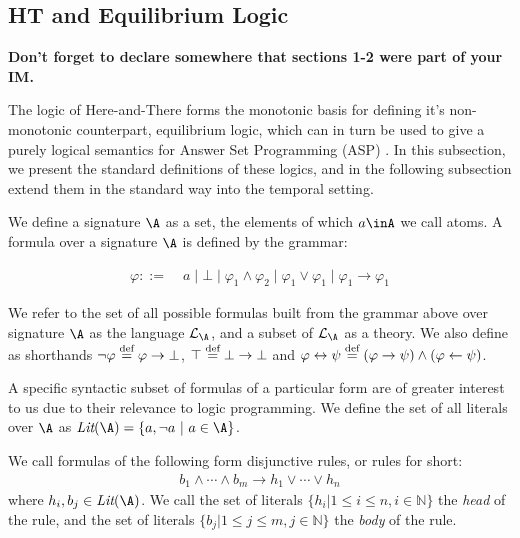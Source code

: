 \subsection{HT and Equilibrium Logic}

\textbf{Don't forget to declare somewhere that sections 1-2 were part
  of your IM.}

The logic of Here-and-There forms the monotonic basis for defining
it's non-monotonic counterpart, equilibrium logic, which can in turn
be used to give a purely logical semantics for Answer Set Programming
(ASP) \cite{pearce06a}. In this subsection, we present the standard
definitions of these logics, and in the following subsection extend
them in the standard way into the temporal setting.

We define a signature $\A$ as a set, the elements of which $a\inA$ we
call atoms. A formula over a signature $\A$ is defined by the grammar:

\begin{align*}
    \varphi ::= &\; a \mid \bot \mid
                  \varphi_1 \wedge \varphi_2 \mid
                  \varphi_1 \vee \varphi_1 \mid
                  \varphi_1 \to \varphi_1
\end{align*}

We refer to the set of all possible formulas built from the grammar
above over signature $\A$ as the language $\langa$, and a
subset of $\langa$ as a theory.  We also define as shorthands
$\neg \varphi \stackrel{\text{def}}{=} \varphi \to \bot$, $\top \stackrel{\text{def}}{=} \bot \to \bot$
and
$\varphi \leftrightarrow \psi \stackrel{\text{def}}{=} (\varphi \rightarrow \psi) \wedge
(\varphi \leftarrow \psi)$.

A specific syntactic subset of formulas of a particular form are of
greater interest to us due to their relevance to logic programming.
We define the set of all literals over $\A$ as
$\textit{Lit}(\A) = \{ a, \lnot a\ |\ a \in \A \}$.

\begin{definition}
    We call formulas of the following form disjunctive rules, or rules for short:
\begin{align*}
  b_{1} \wedge \cdots \wedge b_{m} \rightarrow h_1 \vee \cdots \vee h_{n}
\end{align*}
where $h_{i}, b_{j} \in \textit{Lit}(\A)$. We call the set of literals $\{ h_i | 1 \leq i \leq n, i\in \mathbb{N}\}$ the \emph{head} of the rule, and the set of literals $\{ b_j | 1 \leq j \leq m, j \in \mathbb{N}\}$ the \emph{body} of the rule.
\end{definition}


